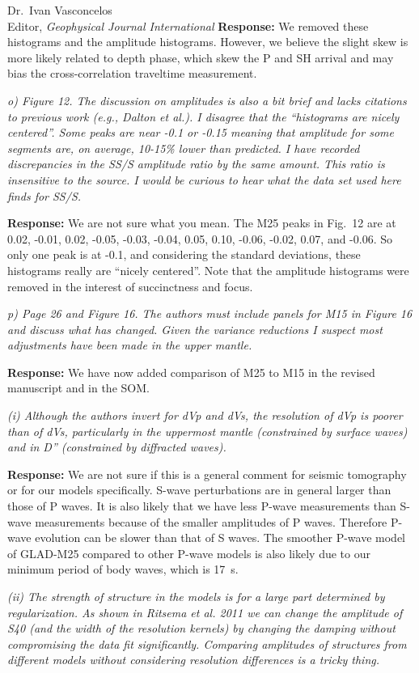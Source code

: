\documentclass[11pt,a4paper]{letter}
\newcommand{\response}[1]{\textbf{Response:} #1}
\newcommand{\rev}[1]{{\it{#1}}}
\begin{document}
\begin{letter}{Dr.~Ivan Vasconcelos\\
Editor, \textit{Geophysical Journal International}}
\response{We removed these histograms and the amplitude histograms. However, we believe the slight skew is more likely related to depth phase, which skew the P and SH arrival and may bias the cross-correlation traveltime measurement.}

\rev{o) Figure 12. The discussion on amplitudes is also a bit brief and lacks citations to previous work (e.g., Dalton et al.).
I disagree that the ``histograms are nicely centered''. Some peaks are near -0.1 or -0.15 meaning that amplitude for some segments are, on average, 10-15\% lower than predicted. I have recorded discrepancies in the SS/S amplitude ratio by the same amount.
This ratio is insensitive to the source. I would be curious to hear what the data set used here finds for SS/S.
}

\response{We are not sure what you mean. The M25 peaks in Fig.~12 are at 0.02, -0.01, 0.02, -0.05, -0.03, -0.04, 0.05, 0.10, -0.06, -0.02, 0.07, and -0.06. So only one peak is at -0.1, and considering the standard deviations, these histograms really are ``nicely centered''.
Note that the amplitude histograms were removed in the interest of succinctness and focus.}

\rev{p) Page 26 and Figure 16. The authors must include panels for M15 in Figure 16 and discuss what has changed.
Given the variance reductions I suspect most adjustments have been made in the upper mantle. }

\response{We have now added comparison of M25 to M15 in the revised manuscript and in the SOM.}


\rev{(i) Although the authors invert for dVp and dVs, the resolution of dVp is poorer than of dVs, particularly in the uppermost mantle (constrained by surface waves) and in D'' (constrained by diffracted waves).}

\response{We are not sure if this is a general comment for seismic tomography or for our models specifically. S-wave perturbations are in general larger than those of P waves. It is also likely that we have less P-wave measurements than S-wave measurements because of the smaller amplitudes of P waves. Therefore P-wave evolution can be slower than that of S waves. The smoother P-wave model of GLAD-M25 compared to other P-wave models is also likely due to our minimum period of body waves, which is 17~s.}

\rev{(ii) The strength of structure in the models is for a large part determined by regularization. As shown in Ritsema et al. 2011 we can change the amplitude of S40 (and the width of the resolution kernels) by changing the damping without compromising the data fit significantly. Comparing amplitudes of structures from different models without considering resolution differences is a tricky thing.}


\end{letter}
\end{document}
